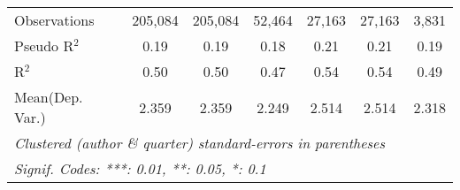 \begin{tabular}{lcccccc}
   Observations         & 205,084       & 205,084       & 52,464         & 27,163        & 27,163        & 3,831\\  
   Pseudo R$^2$         & 0.19          & 0.19          & 0.18           & 0.21          & 0.21          & 0.19\\  
   R$^2$                & 0.50          & 0.50          & 0.47           & 0.54          & 0.54          & 0.49\\  
Mean(Dep. Var.) & 2.359 & 2.359 & 2.249 & 2.514 & 2.514 & 2.318 \\
   \midrule \midrule
   \multicolumn{7}{l}{\emph{Clustered (author \& quarter) standard-errors in parentheses}}\\
   \multicolumn{7}{l}{\emph{Signif. Codes: ***: 0.01, **: 0.05, *: 0.1}}\\
\end{tabular}
\par\endgroup
